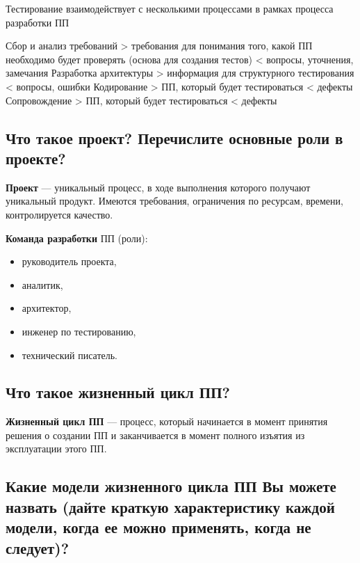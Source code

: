 Тестирование взаимодействует с несколькими процессами в рамках процесса
разработки ПП

Сбор и анализ требований 
> требования для понимания того, какой ПП необходимо будет проверять (основа
для создания тестов)
< вопросы, уточнения, замечания
Разработка архитектуры
> информация для структурного тестирования 
< вопросы, ошибки
Кодирование
> ПП, который будет тестироваться
< дефекты
Сопровождение 
> ПП, который будет тестироваться
< дефекты

\subsection{Что такое проект? Перечислите основные роли в проекте?}

\textbf{Проект} --- уникальный процесс, в ходе выполнения которого получают
уникальный продукт. Имеются требования, ограничения по ресурсам, времени,
контролируется качество.

\textbf{Команда разработки} ПП (роли):
\begin{itemize}
    \item руководитель проекта,
    \item аналитик,
    \item архитектор,
    \item инженер по тестированию,
    \item технический писатель.
\end{itemize}

\subsection{Что такое жизненный цикл ПП?}

\textbf{Жизненный цикл ПП} --- процесс, который начинается в момент принятия
решения о создании ПП и заканчивается в момент полного изъятия из эксплуатации
этого ПП.

\subsection{Какие модели жизненного цикла ПП Вы можете назвать (дайте краткую
характеристику каждой модели, когда ее можно применять, когда не следует)?}

